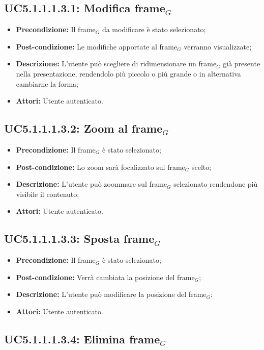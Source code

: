 \subsection{ UC5.1.1.1.3.1: Modifica frame$_G$}

\begin{itemize}
	\item \textbf{Precondizione:} Il frame$_G$ da modificare è stato selezionato;
	\item \textbf{Post-condizione:} Le modifiche apportate al frame$_G$ verranno visualizzate;
	\item \textbf{Descrizione:} L'utente può scegliere di ridimensionare un frame$_G$ già presente nella presentazione, rendendolo più piccolo o più grande o in alternativa cambiarne la forma;
	\item \textbf{Attori:} Utente autenticato.
\end{itemize}
\subsection{ UC5.1.1.1.3.2: Zoom al frame$_G$}

\begin{itemize}
	\item \textbf{Precondizione:} Il frame$_G$ è stato selezionato;
	\item \textbf{Post-condizione:} Lo zoom sarà focalizzato sul frame$_G$ scelto;
	\item \textbf{Descrizione:} L'utente può zoommare sul frame$_G$ selezionato rendendone più visibile il contenuto;
	\item \textbf{Attori:} Utente autenticato.
\end{itemize}
\subsection{ UC5.1.1.1.3.3: Sposta frame$_G$}

\begin{itemize}
	\item \textbf{Precondizione:} Il frame$_G$ è stato selezionato;
	\item \textbf{Post-condizione:} Verrà cambiata la posizione del frame$_G$;
	\item \textbf{Descrizione:} L'utente può modificare la posizione del frame$_G$;
	\item \textbf{Attori:} Utente autenticato.
\end{itemize}
\subsection{ UC5.1.1.1.3.4: Elimina frame$_G$}

